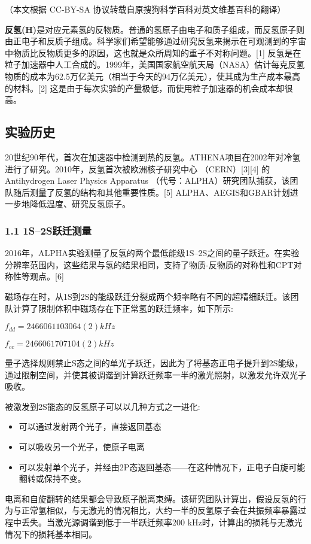 
（本文根据 CC-BY-SA 协议转载自原搜狗科学百科对英文维基百科的翻译）

\textbf{反氢(H)}是对应元素氢的反物质。普通的氢原子由电子和质子组成，而反氢原子则由正电子和反质子组成。科学家们希望能够通过研究反氢来揭示在可观测到的宇宙中物质比反物质更多的原因，这也就是众所周知的重子不对称问题。[1] 反氢是在粒子加速器中人工合成的。1999年，美国国家航空航天局（NASA）估计每克反氢物质的成本为62.5万亿美元（相当于今天的94万亿美元），使其成为生产成本最高的材料。[2] 这是由于每次实验的产量极低，而使用粒子加速器的机会成本却很高。

\subsection{实验历史}
20世纪90年代，首次在加速器中检测到热的反氢。ATHENA项目在2002年对冷氢进行了研究。2010年，反氢首次被欧洲核子研究中心 （CERN）[3][4] 的Antihydrogen Laser Physics Apparatus （代号：ALPHA）研究团队捕获，该团队随后测量了反氢的结构和其他重要性质。[5] ALPHA、AEGIS和GBAR计划进一步地降低温度、研究反氢原子。
\subsubsection{1.1 1S–2S跃迁测量}
2016年，ALPHA实验测量了反氢的两个最低能级1S–2S之间的量子跃迁。在实验分辨率范围内，这些结果与氢的结果相同，支持了物质-反物质的对称性和CPT对称性等观点。[6]

磁场存在时，从1S到2S的能级跃迁分裂成两个频率略有不同的超精细跃迁。该团队计算了限制体积中磁场存在下正常氢的跃迁频率，如下所示:

$f_{dd} =2 466 061 103 064 (2) kHz$

$f_{cc} =2 466 061 707 104 (2) kHz$

量子选择规则禁止S态之间的单光子跃迁，因此为了将基态正电子提升到2S能级，通过限制空间，并使其被调谐到计算跃迁频率一半的激光照射，以激发允许双光子吸收。

被激发到2S能态的反氢原子可以以几种方式之一进化:
\begin{itemize}
\item 可以通过发射两个光子，直接返回基态
\item 可以吸收另一个光子，使原子电离
\item 可以发射单个光子，并经由2P态返回基态——在这种情况下，正电子自旋可能翻转或保持不变。
\end{itemize}
电离和自旋翻转的结果都会导致原子脱离束缚。该研究团队计算出，假设反氢的行为与正常氢相似，与无激光的情况相比，大约一半的反氢原子会在共振频率暴露过程中丢失。当激光源调谐到低于一半跃迁频率200 kHz时，计算出的损耗与无激光情况下的损耗基本相同。

